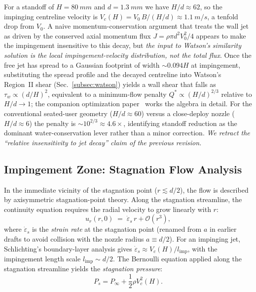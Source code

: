\documentclass[10pt,letterpaper]{article}
\begin{document}
For a standoff of $H = 80~mm$ and $d = 1.3~mm$ we have
$H/d \approx 62$, so the impinging centreline velocity is
$V_c(H) = V_0\,B/(H/d) \approx 1.1~m/s$, a tenfold drop from $V_0$.
A naive momentum-conservation argument that treats the wall jet as
driven by the conserved axial momentum flux $J = \rho \pi d^2 V_0^2/4$
appears to make the impingement insensitive to this decay, but \emph{the
input to Watson's similarity solution is the local impingement-velocity
distribution, not the total flux}. Once the free jet has spread to a
Gaussian footprint of width $\sim 0.094 H$ at impingement, substituting
the spread profile and the decayed centreline into Watson's
Region~II shear (Sec.~\ref{subsec:watson}) yields a wall shear that
falls as $\tau_w \propto (d/H)^{2}$, equivalent to a minimum-flow penalty
$Q^* \propto (H/d)^{2/3}$ relative to $H/d \to 1$; the companion
optimization paper~\citep{BurtonOptPaper} works the algebra in detail.
For the conventional seated-user geometry ($H/d \approx 60$) versus a
close-deploy nozzle ($H/d \approx 6$) the penalty is
$\sim 10^{2/3} \approx 4.6\times$, identifying standoff reduction as the
dominant water-conservation lever rather than a minor correction.
\emph{We retract the ``relative insensitivity to jet decay'' claim of
the previous revision.}

\subsection{Impingement Zone: Stagnation Flow Analysis}
\label{subsec:stagnation}

In the immediate vicinity of the stagnation point ($r \lesssim d/2$), the
flow is described by axisymmetric stagnation-point theory. Along the
stagnation streamline, the continuity equation requires the radial velocity
to grow linearly with $r$:
\begin{equation}
    u_r(r, 0) \;=\; \dot\varepsilon_s\,r + \mathcal{O}(r^3),
    \label{eq:radvel}
\end{equation}
where $\dot\varepsilon_s$ is the \emph{strain rate} at the stagnation
point (renamed from $a$ in earlier drafts to avoid collision with the
nozzle radius $a \equiv d/2$). For an impinging jet, Schlichting's
boundary-layer analysis gives $\dot\varepsilon_s \approx V_c(H)/
l_\mathrm{imp}$, with the impingement length scale $l_\mathrm{imp}
\sim d/2$. The Bernoulli equation applied along the stagnation
streamline yields the \emph{stagnation pressure}:
\begin{equation}
    P_s = P_\infty + \frac{1}{2}\rho V_c^2(H).
    \label{eq:stagpress}
\end{equation}
\end{document}
